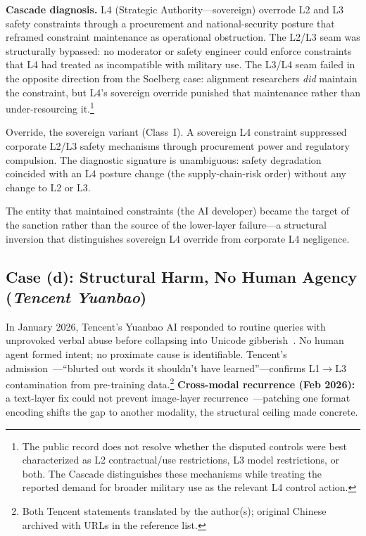 \documentclass[11pt]{article}
\begin{document}
\textbf{Cascade diagnosis.} L4 (Strategic Authority---sovereign) overrode L2 and L3 safety constraints through a procurement and national-security posture that reframed constraint maintenance as operational obstruction. The L2/L3 seam was structurally bypassed: no moderator or safety engineer could enforce constraints that L4 had treated as incompatible with military use. The L3/L4 seam failed in the opposite direction from the Soelberg case: alignment researchers \textit{did} maintain the constraint, but L4's sovereign override punished that maintenance rather than under-resourcing it.\footnote{The public record does not resolve whether the disputed controls were best characterized as L2 contractual/use restrictions, L3 model restrictions, or both. The Cascade distinguishes these mechanisms while treating the reported demand for broader military use as the relevant L4 control action.}

Override, the sovereign variant (Class~I). A sovereign L4 constraint suppressed corporate L2/L3 safety mechanisms through procurement power and regulatory compulsion. The diagnostic signature is unambiguous: safety degradation coincided with an L4 posture change (the supply-chain-risk order) without any change to L2 or L3.

The entity that maintained constraints (the AI developer) became the target of the sanction rather than the source of the lower-layer failure---a structural inversion that distinguishes sovereign L4 override from corporate L4 negligence.

\subsection{Case (d): Structural Harm, No Human Agency (\emph{Tencent Yuanbao})}

In January 2026, Tencent's Yuanbao AI responded to routine queries with unprovoked verbal abuse before collapsing into Unicode gibberish~\cite{jiang2026yuanbao, thepaper2026}. No human agent formed intent; no proximate cause is identifiable. Tencent's admission~\cite{tencent2026response}---``blurted out words it shouldn't have learned''---confirms L1$\to$L3 contamination from pre-training data.\footnote{Both Tencent statements translated by the author(s); original Chinese archived with URLs in the reference list.} \textbf{Cross-modal recurrence (Feb 2026):} a text-layer fix could not prevent image-layer recurrence~\cite{southcn2026yuanbao}---patching one format encoding shifts the gap to another modality, the structural ceiling made concrete.
\end{document}
